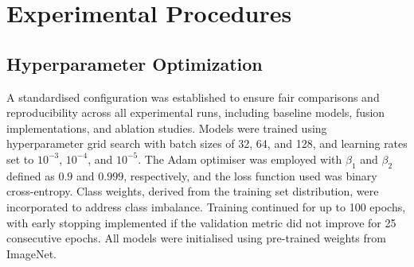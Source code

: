 



\section{Experimental Procedures}
\subsection{Hyperparameter Optimization}

A standardised configuration was established to ensure fair comparisons and reproducibility across all experimental runs, including baseline models, fusion implementations, and ablation studies. Models were trained using hyperparameter grid search with batch sizes of 32, 64, and 128, and learning rates set to $10^{-3}$, $10^{-4}$, and $10^{-5}$.
The Adam optimiser was employed with $\beta_1$ and $\beta_2$ defined as $0.9$ and $0.999$, respectively, and the loss function used was binary cross-entropy. Class weights, derived from the training set distribution, were incorporated to address class imbalance.
Training continued for up to 100 epochs, with early stopping implemented if the validation metric did not improve for 25 consecutive epochs. All models were initialised using pre-trained weights from ImageNet.

